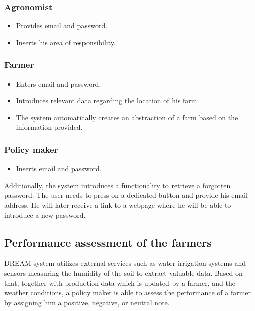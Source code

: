 \subsubsection*{Agronomist}

\begin{itemize}
    \item Provides email and password.
    \item Inserts his area of responsibility.
\end{itemize}

\subsubsection*{Farmer}

\begin{itemize}
    \item Enters email and password.
    \item Introduces relevant data regarding the location of his farm.
    \item The system automatically creates an abstraction of a farm based on the information provided. 
\end{itemize}

\subsubsection*{Policy maker}

\begin{itemize}
    \item Inserts email and password.
\end{itemize}

Additionally, the system introduces a functionality to retrieve a forgotten password. The user needs to press on a dedicated button and provide his email address. He will later receive a link to a webpage where he will be able to introduce a new password. 

\subsection{Performance assessment of the farmers}

DREAM system utilizes external services such as water irrigation systems and sensors measuring the humidity of the soil to extract valuable data. Based on that, together with production data which is updated by a farmer, and the weather conditions, a policy maker is able to assess the performance of a farmer by assigning him a positive, negative, or neutral note.

